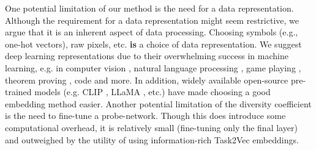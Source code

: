 One potential limitation of our method is the need for a data representation.
Although the requirement for a data representation might seem restrictive, we argue that it is an inherent aspect of data processing.
Choosing symbols (e.g., one-hot vectors), raw pixels, etc. \textbf{is} a choice of data representation.
We suggest deep learning representations due to their overwhelming success in machine learning, e.g. in computer vision \citep{alexnet, resnet}, natural language processing \citep{bert, gpt3, chowdhery2022palm, gpt4, google2023palm2}, game playing \citep{alphago, atari1, EfficientZero}, theorem proving \citep{skiptree, gptf, pact}, code \citep{codex} and more.
In addition, widely available open-source pre-trained models (e.g. CLIP \citep{clip}, LLaMA \citep{llama}, etc.) have made choosing a good embedding method easier. Another potential limitation of the diversity coefficient is the need to fine-tune a probe-network. Though this does introduce some computational overhead, it is relatively small (fine-tuning only the final layer) and outweighed by the utility of using information-rich Task2Vec embeddings. %

